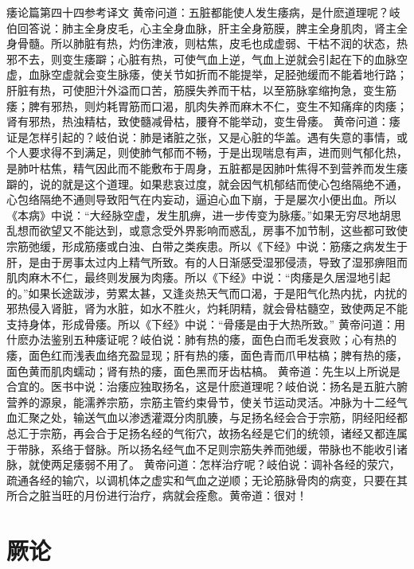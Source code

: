 \documentclass[a4paper,12pt,UTF8,twoside]{ctexbook}
\begin{document}
痿论篇第四十四参考译文
黄帝问道：五脏都能使人发生痿病，是什麽道理呢？岐伯回答说：肺主全身皮毛，心主全身血脉，肝主全身筋膜，脾主全身肌肉，肾主全身骨髓。所以肺脏有热，灼伤津液，则枯焦，皮毛也成虚弱、干枯不润的状态，热邪不去，则变生痿躃；心脏有热，可使气血上逆，气血上逆就会引起在下的血脉空虚，血脉空虚就会变生脉痿，使关节如折而不能提举，足胫弛缓而不能着地行路；肝脏有热，可使胆汁外溢而口苦，筋膜失养而干枯，以至筋脉挛缩拘急，变生筋痿；脾有邪热，则灼耗胃筋而口渴，肌肉失养而麻木不仁，变生不知痛痒的肉痿；肾有邪热，热浊精枯，致使髓减骨枯，腰脊不能举动，变生骨痿。
黄帝问道：痿证是怎样引起的？岐伯说：肺是诸脏之张，又是心脏的华盖。遇有失意的事情，或个人要求得不到满足，则使肺气郁而不畅，于是出现喘息有声，进而则气郁化热，是肺叶枯焦，精气因此而不能敷布于周身，五脏都是因肺叶焦得不到营养而发生痿躃的，说的就是这个道理。如果悲哀过度，就会因气机郁结而使心包络隔绝不通，心包络隔绝不通则导致阳气在内妄动，逼迫心血下崩，于是屡次小便出血。所以《本病》中说：“大经脉空虚，发生肌痹，进一步传变为脉痿。”如果无穷尽地胡思乱想而欲望又不能达到，或意念受外界影响而惑乱，房事不加节制，这些都可致使宗筋弛缓，形成筋痿或白浊、白带之类疾患。所以《下经》中说：筋痿之病发生于肝，是由于房事太过内上精气所致。有的人日渐感受湿邪侵渍，导致了湿邪痹阻而肌肉麻木不仁，最终则发展为肉痿。所以《下经》中说：“肉痿是久居湿地引起的。”如果长途跋涉，劳累太甚，又逢炎热天气而口渴，于是阳气化热内扰，内扰的邪热侵入肾脏，肾为水脏，如水不胜火，灼耗阴精，就会骨枯髓空，致使两足不能支持身体，形成骨痿。所以《下经》中说：“骨痿是由于大热所致。”
黄帝问道：用什麽办法鉴别五种痿证呢？岐伯说：肺有热的痿，面色白而毛发衰败；心有热的痿，面色红而浅表血络充盈显现；肝有热的痿，面色青而爪甲枯槁；脾有热的痿，面色黄而肌肉蠕动；肾有热的痿，面色黑而牙齿枯槁。
黄帝道：先生以上所说是合宜的。医书中说：治痿应独取扬名，这是什麽道理呢？岐伯说：扬名是五脏六腑营养的源泉，能濡养宗筋，宗筋主管约束骨节，使关节运动灵活。冲脉为十二经气血汇聚之处，输送气血以渗透灌溉分肉肌腠，与足扬名经会合于宗筋，阴经阳经都总汇于宗筋，再会合于足扬名经的气衔穴，故扬名经是它们的统领，诸经又都连属于带脉，系络于督脉。所以扬名经气血不足则宗筋失养而弛缓，带脉也不能收引诸脉，就使两足痿弱不用了。
黄帝问道：怎样治疗呢？岐伯说：调补各经的荥穴，疏通各经的输穴，以调机体之虚实和气血之逆顺；无论筋脉骨肉的病变，只要在其所合之脏当旺的月份进行治疗，病就会痊愈。黄帝道：很对！

\chapter{厥论}
\end{document}
